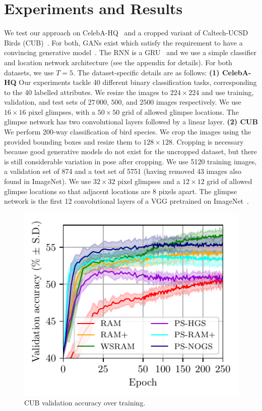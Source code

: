 \section{Experiments and Results} \label{sec:nogs-exp}
\label{sec:nogs-experiments}
%
We test our approach on CelebA-HQ~\cite{karras2017progressive} and a cropped
variant of Caltech-UCSD Birds (CUB)~\cite{wah2011caltech}. For both, GANs exist
which satisfy the requirement to have a convincing generative
model~\cite{karras2018style,singh2019finegan}. The RNN is a
GRU~\cite{cho2014learning} and we use a simple classifier and location network
architecture (see the appendix for details). For both
datasets, we use $T=5$. The dataset-specific details are as follows: \textbf{(1)
  CelebA-HQ} Our experiments tackle 40 different binary classification tasks,
corresponding to the 40 labelled attributes. We resize the images to $224 \times
224$ and use training, validation, and test sets of $27\,000$, $500$, and $2500$
images respectively. We use $16\times16$ pixel glimpses, with a $50\times50$
grid of allowed glimpse locations. The glimpse network has two convolutional
layers followed by a linear layer. \textbf{(2) CUB} We perform 200-way
classification of bird species. We crop the images using the provided bounding
boxes and resize them to $128 \times 128$. Cropping is necessary because good
generative models do not exist for the uncropped dataset, but there is still
considerable variation in pose after cropping. We use 5120 training images, a
validation set of 874 and a test set of 5751 (having removed 43 images also
found in ImageNet). We use $32\times32$ pixel glimpses and a $12\times12$ grid
of allowed glimpse locations so that adjacent locations are 8 pixels apart. The
glimpse network is the first 12 convolutional layers of a VGG pretrained on
ImageNet~\cite{simonyan2014very, imagenet}.

\begin{figure}
  \centering
  \includegraphics[scale=1]{figs/nogs/birds-training-avg}
  \vspace{-.4cm}
  \caption{CUB validation accuracy over training. }
  \vspace{-.4cm}
  \label{fig:birds-training}
\end{figure}

